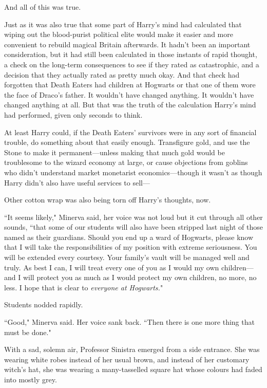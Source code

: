And all of this was true.

Just as it was also true that some part of Harry's mind had calculated that wiping out the blood-purist political elite would make it easier and more convenient to rebuild magical Britain afterwards. It hadn't been an important consideration, but it had still been calculated in those instants of rapid thought, a check on the long-term consequences to see if they rated as catastrophic, and a decision that they actually rated as pretty much okay. And that check had forgotten that Death Eaters had children at Hogwarts or that one of them wore the face of Draco's father. It wouldn't have changed anything. It wouldn't have changed anything at all. But that was the truth of the calculation Harry's mind had performed, given only seconds to think.

At least Harry could, if the Death Eaters' survivors were in any sort of financial trouble, do something about that easily enough. Transfigure gold, and use the Stone to make it permanent—unless making that much gold would be troublesome to the wizard economy at large, or cause objections from goblins who didn't understand market monetarist economics—though it wasn't as though Harry didn't also have useful services to sell—

Other cotton wrap was also being torn off Harry's thoughts, now.

``It seems likely," Minerva said, her voice was not loud but it cut through all other sounds, ``that some of our students will also have been stripped last night of those named as their guardians. Should you end up a ward of Hogwarts, please know that I will take the responsibilities of my position with extreme seriousness. You will be extended every courtesy. Your family's vault will be managed well and truly. As best I can, I will treat every one of you as I would my own children—and I will protect you as much as I would protect my own children, no more, no less. I hope that is clear to \emph{everyone at Hogwarts.}"

Students nodded rapidly.

``Good," Minerva said. Her voice sank back. ``Then there is one more thing that must be done."

With a sad, solemn air, Professor Sinistra emerged from a side entrance. She was wearing white robes instead of her usual brown, and instead of her customary witch's hat, she was wearing a many-tasselled square hat whose colours had faded into mostly grey.

